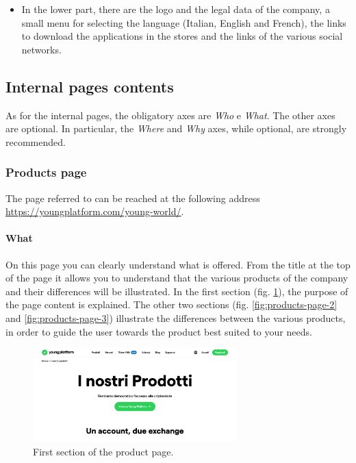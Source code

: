 \begin{itemize}
  \item In the lower part, there are the logo and the legal data of the 
  company, a small menu for selecting the language (Italian, English and 
  French), the links to download the applications in the stores and the 
  links of the various social networks.
\end{itemize}

\subsection{Internal pages contents}

As for the internal pages, the obligatory axes are \textit{Who} e 
\textit{What}. The other axes are optional. In particular, the 
\textit{Where} and \textit{Why} axes, while optional, are strongly 
recommended.

\subsubsection{Products page}

The page referred to can be reached at the following address 
\href{https://youngplatform.com/young-world/}{https://youngplatform.com/young-world/}.

\paragraph{What}

On this page you can clearly understand what is offered. From the title at 
the top of the page it allows you to understand that the various products 
of the company and their differences will be illustrated. In the first 
section (fig. \ref{fig:products-page-1}), the purpose of the page content 
is explained. The other two sections (fig. \ref{fig:products-page-2} and 
\ref{fig:products-page-3}) illustrate the differences between the various 
products, in order to guide the user towards the product best suited to 
your needs.
\begin{figure}[H]
  \centering
  \includegraphics[width=0.70\textwidth]{res/images/internal-pages/products-page/products-page-1.png}
  \caption{First section of the product page.}
  \label{fig:products-page-1}
\end{figure}

